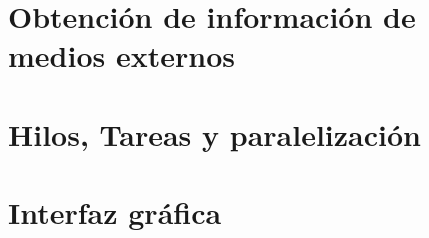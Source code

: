 \section{Obtención de información de medios externos}

\section{Hilos, Tareas y paralelización}

\section{Interfaz gráfica}


